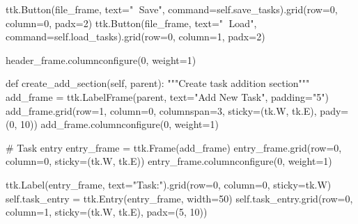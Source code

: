 \documentclass[
  letterpaper,
  DIV=11,
  numbers=noendperiod,
  oneside]{scrreprt}
\newenvironment{Shaded}{}{}
\newcommand{\CommentTok}[1]{\textcolor[rgb]{0.42,0.45,0.49}{#1}}
\newcommand{\DecValTok}[1]{\textcolor[rgb]{0.00,0.36,0.77}{#1}}
\newcommand{\KeywordTok}[1]{\textcolor[rgb]{0.84,0.23,0.29}{#1}}
\newcommand{\NormalTok}[1]{\textcolor[rgb]{0.14,0.16,0.18}{#1}}
\newcommand{\OperatorTok}[1]{\textcolor[rgb]{0.14,0.16,0.18}{#1}}
\newcommand{\StringTok}[1]{\textcolor[rgb]{0.01,0.18,0.38}{#1}}
\newcommand{\VariableTok}[1]{\textcolor[rgb]{0.89,0.38,0.04}{#1}}
\begin{document}
\begin{Shaded}
\begin{Highlighting}[]
\NormalTok{        ttk.Button(file\_frame, text}\OperatorTok{=}\StringTok{"💾 Save"}\NormalTok{, }
\NormalTok{                  command}\OperatorTok{=}\VariableTok{self}\NormalTok{.save\_tasks).grid(row}\OperatorTok{=}\DecValTok{0}\NormalTok{, column}\OperatorTok{=}\DecValTok{0}\NormalTok{, padx}\OperatorTok{=}\DecValTok{2}\NormalTok{)}
\NormalTok{        ttk.Button(file\_frame, text}\OperatorTok{=}\StringTok{"📁 Load"}\NormalTok{, }
\NormalTok{                  command}\OperatorTok{=}\VariableTok{self}\NormalTok{.load\_tasks).grid(row}\OperatorTok{=}\DecValTok{0}\NormalTok{, column}\OperatorTok{=}\DecValTok{1}\NormalTok{, padx}\OperatorTok{=}\DecValTok{2}\NormalTok{)}
        
\NormalTok{        header\_frame.columnconfigure(}\DecValTok{0}\NormalTok{, weight}\OperatorTok{=}\DecValTok{1}\NormalTok{)}
    
    \KeywordTok{def}\NormalTok{ create\_add\_section(}\VariableTok{self}\NormalTok{, parent):}
        \CommentTok{"""Create task addition section"""}
\NormalTok{        add\_frame }\OperatorTok{=}\NormalTok{ ttk.LabelFrame(parent, text}\OperatorTok{=}\StringTok{"Add New Task"}\NormalTok{, padding}\OperatorTok{=}\StringTok{"5"}\NormalTok{)}
\NormalTok{        add\_frame.grid(row}\OperatorTok{=}\DecValTok{1}\NormalTok{, column}\OperatorTok{=}\DecValTok{0}\NormalTok{, columnspan}\OperatorTok{=}\DecValTok{3}\NormalTok{, sticky}\OperatorTok{=}\NormalTok{(tk.W, tk.E), pady}\OperatorTok{=}\NormalTok{(}\DecValTok{0}\NormalTok{, }\DecValTok{10}\NormalTok{))}
\NormalTok{        add\_frame.columnconfigure(}\DecValTok{0}\NormalTok{, weight}\OperatorTok{=}\DecValTok{1}\NormalTok{)}
        
        \CommentTok{\# Task entry}
\NormalTok{        entry\_frame }\OperatorTok{=}\NormalTok{ ttk.Frame(add\_frame)}
\NormalTok{        entry\_frame.grid(row}\OperatorTok{=}\DecValTok{0}\NormalTok{, column}\OperatorTok{=}\DecValTok{0}\NormalTok{, sticky}\OperatorTok{=}\NormalTok{(tk.W, tk.E))}
\NormalTok{        entry\_frame.columnconfigure(}\DecValTok{0}\NormalTok{, weight}\OperatorTok{=}\DecValTok{1}\NormalTok{)}
        
\NormalTok{        ttk.Label(entry\_frame, text}\OperatorTok{=}\StringTok{"Task:"}\NormalTok{).grid(row}\OperatorTok{=}\DecValTok{0}\NormalTok{, column}\OperatorTok{=}\DecValTok{0}\NormalTok{, sticky}\OperatorTok{=}\NormalTok{tk.W)}
        \VariableTok{self}\NormalTok{.task\_entry }\OperatorTok{=}\NormalTok{ ttk.Entry(entry\_frame, width}\OperatorTok{=}\DecValTok{50}\NormalTok{)}
        \VariableTok{self}\NormalTok{.task\_entry.grid(row}\OperatorTok{=}\DecValTok{0}\NormalTok{, column}\OperatorTok{=}\DecValTok{1}\NormalTok{, sticky}\OperatorTok{=}\NormalTok{(tk.W, tk.E), padx}\OperatorTok{=}\NormalTok{(}\DecValTok{5}\NormalTok{, }\DecValTok{10}\NormalTok{))}
        

\end{Highlighting}
\end{Shaded}
\end{document}
